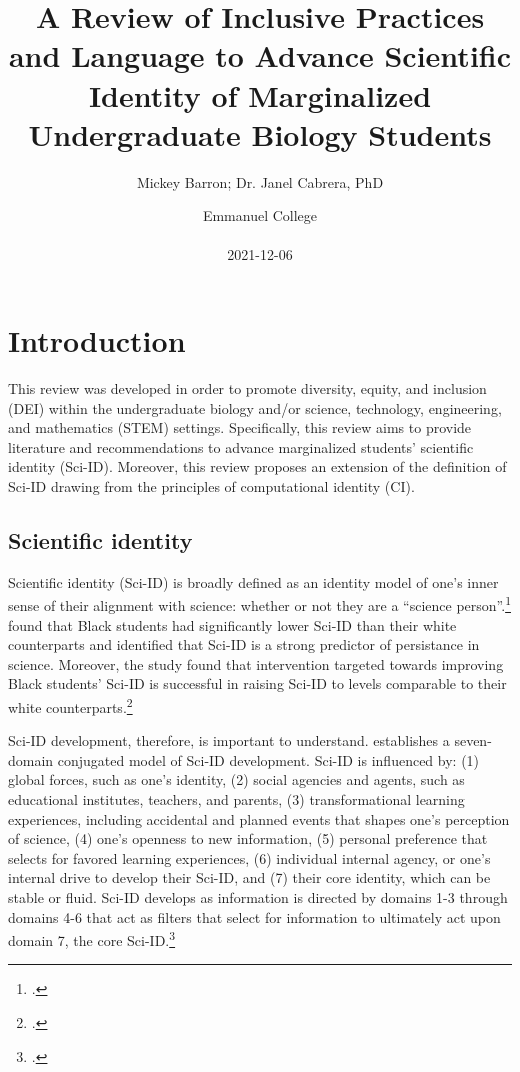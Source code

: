 \documentclass[10pt, twocolumn]{article}
\title{A Review of Inclusive Practices and Language to Advance Scientific Identity of Marginalized Undergraduate Biology Students}
\author{Mickey Barron; Dr. Janel Cabrera, PhD}
\date{Emmanuel College \\ ~ \\ 2021-12-06}
\begin{document}
\begingroup

    \onecolumn

    \maketitle


    \tableofcontents

    \twocolumn


\endgroup

\section{Introduction}

    This review was developed in order to promote diversity, equity, and inclusion (DEI) within the undergraduate biology and/or science, technology, engineering, and mathematics (STEM) settings. Specifically, this review aims to provide literature and recommendations to advance marginalized students' scientific identity (Sci-ID). Moreover, this review proposes an extension of the definition of Sci-ID drawing from the principles of computational identity (CI).

    \subsection{Scientific identity}

        Scientific identity (Sci-ID) is broadly defined as an identity model of one's inner sense of their alignment with science: whether or not they are a ``science person''.\footcite{salehjee_models_2018} \cite{oseguera_examining_2019} found that Black students had significantly lower Sci-ID than their white counterparts and identified that Sci-ID is a strong predictor of persistance in science. Moreover, the study found that intervention targeted towards improving Black students' Sci-ID is successful in raising Sci-ID to levels comparable to their white counterparts.\footcite{oseguera_examining_2019}
        
        Sci-ID development, therefore, is important to understand. \cite{salehjee_models_2018} establishes a seven-domain conjugated model of Sci-ID development. Sci-ID is influenced by: (1) global forces, such as one's identity, (2) social agencies and agents, such as educational institutes, teachers, and parents, (3) transformational learning experiences, including accidental and planned events that shapes one's perception of science, (4) one's openness to new information, (5) personal preference that selects for favored learning experiences, (6) individual internal agency, or one's internal drive to develop their Sci-ID, and (7) their core identity, which can be stable or fluid. Sci-ID develops as information is directed by domains 1-3 through domains 4-6 that act as filters that select for information to ultimately act upon domain 7, the core Sci-ID.\footcite{salehjee_models_2018}
\end{document}
